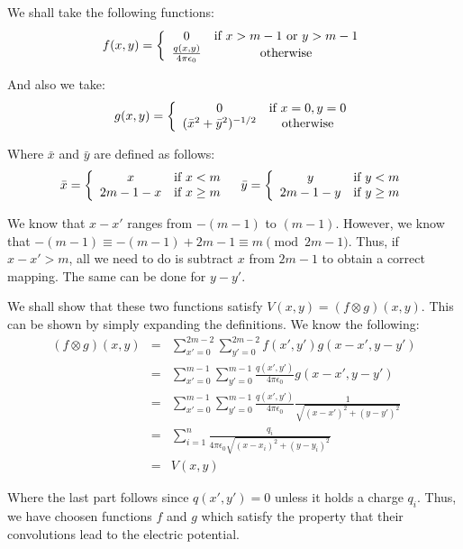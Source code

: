 \documentclass[psamsfonts]{amsart}
\newenvironment{sol}{{\bfseries Solution}}{\qedsymbol}
\theoremstyle{definition}
\theoremstyle{remark}
\numberwithin{equation}{section}
\begin{document}
\begin{sol}
We shall take the following functions:
\begin{equation}
f(x,y) = \left\{ \begin{array}{c c}
0 & \text{if } x > m-1 \text{ or } y > m- 1 \\
\frac{q(x,y)}{4 \pi \epsilon_0} & \text{otherwise}
\end{array} 
\right.
\end{equation}

And also we take:
\begin{equation}
g(x,y) = \left\{ \begin{array}{c c} 
0 & \text{if } x =0, y = 0 \\
(\bar{x}^2 + \bar{y}^2)^{-1/2} & \text{otherwise}
\end{array} \right.
\end{equation}

Where $\bar{x}$ and $\bar{y}$ are defined as follows:
\begin{equation}
\begin{array}{c c}
\bar{x} = \left\{ \begin{array}{c c} 
x & \text{if } x < m \\
2m - 1 - x & \text{if } x \geq m 
\end{array} \right.
& 
\bar{y} = \left\{ \begin{array}{c c} 
y & \text{if } y < m \\
2m - 1 - y & \text{if } y \geq m 
\end{array} \right.
\end{array}
\end{equation}

We know that $x - x'$ ranges from $-(m-1)$ to $(m-1)$. However, we know that $- (m - 1) \equiv -(m - 1) + 2m - 1 \equiv m \pmod{2m - 1}$. Thus, if $x - x' > m$, all we need to do is subtract $x$ from $2m - 1$ to obtain a correct mapping. The same can be done for $y - y'$.  

We shall show that these two functions satisfy $V(x,y) = (f \otimes g)(x,y)$. This can be shown by simply expanding the definitions. We know the following:
\begin{eqnarray}
(f \otimes g)(x,y) &=& \sum_{x'=0}^{2m-2} \sum_{y'=0}^{2m-2} f(x',y') g(x - x', y - y') \\
&=& \sum_{x'=0}^{m-1} \sum_{y'=0}^{m-1} \frac{q(x',y')}{4 \pi \epsilon_0} g(x -x', y-y') \\
&=& \sum_{x'=0}^{m-1} \sum_{y'=0}^{m-1} \frac{q(x',y')}{4 \pi \epsilon_0} \frac{1}{\sqrt{(x-x')^2 + (y - y')^2}} \\
&=& \sum_{i=1}^{n} \frac{ q_i}{4 \pi \epsilon_0 \sqrt{ (x-x_i)^2 + (y - y_i)^2}} \\
&=& V(x,y)
\end{eqnarray}

Where the last part follows since $q(x',y') = 0$ unless it holds a charge $q_i$. Thus, we have choosen functions $f$ and $g$ which satisfy the property that their convolutions lead to the electric potential.
\end{sol}
\end{document}
